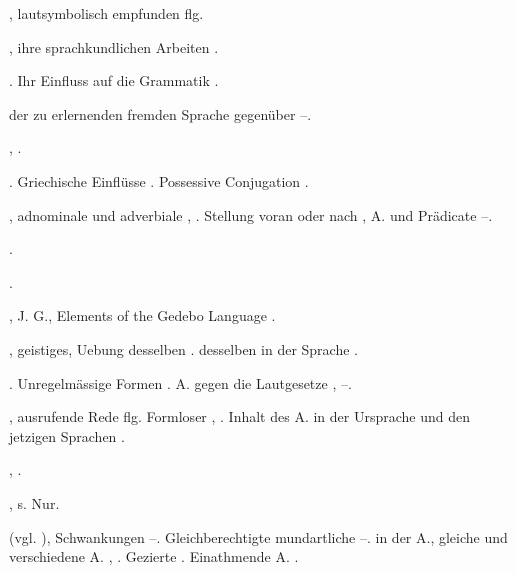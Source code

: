 \begin{register}
, lautsymbolisch empfunden \pageref{sp.220} flg.


, ihre sprachkundlichen Arbeiten \pageref{sp.18}.

. Ihr Einfluss auf die Grammatik \pageref{sp.95}.

 der zu erlernenden fremden Sprache gegenüber \pageref{sp.83}–\pageref{sp.84}.

 \pageref{sp.405}, \pageref{sp.423}.

.  Griechische Einflüsse \pageref{sp.272}. Possessive Conjugation \pageref{sp.391}.


, adnominale und adverbiale \pageref{sp.101}, \pageref{sp.462}. Stellung voran oder nach \pageref{sp.149}, A. und Prädicate \pageref{sp.451}–\pageref{sp.459}.

 \pageref{sp.458}.

 \pageref{sp.103}.

, J. G., Elements of the Gedebo Language \pageref{sp.379}.

, geistiges, Uebung desselben \pageref{sp.32}.  desselben in der Sprache \pageref{sp.325}.



. Unregelmässige Formen \pageref{sp.64}. A. gegen die Lautgesetze \pageref{sp.141}, \pageref{sp.187}–\pageref{sp.209}.

, ausrufende Rede \pageref{sp.319} flg. Formloser \pageref{sp.345}, \pageref{sp.360}. Inhalt des A. in der Ursprache und den jetzigen Sprachen \pageref{sp.349}.

 \pageref{sp.103}, \pageref{sp.321}.

, s. Nur.

 (vgl. ), Schwankungen \pageref{sp.33}–\pageref{sp.34}. Gleichberechtigte mundartliche \pageref{sp.125}–\pageref{sp.126}.  in der A., gleiche und verschiedene A. \pageref{sp.184}, \pageref{sp.245}. Gezierte \pageref{sp.187}. Einathmende A. \pageref{sp.225}.


\end{register}
